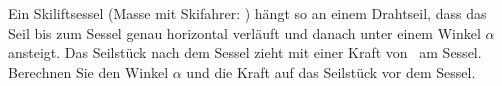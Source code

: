Ein Skiliftsessel (Masse mit Skifahrer: \mSkO) hängt so an einem Drahtseil, dass das Seil bis zum Sessel genau horizontal verläuft und danach unter einem Winkel $\alpha$ ansteigt. Das Seilstück nach dem Sessel zieht mit einer Kraft von \FSzO\ am Sessel. Berechnen Sie den Winkel $\alpha$ und die Kraft auf das Seilstück vor dem Sessel.
